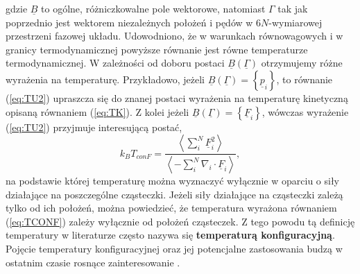 \documentclass[12pt,a4paper,openright]{report} %
\begin{document}
gdzie $\underline{B}$ to ogólne, różniczkowalne pole wektorowe, natomiast $\Gamma$ tak jak poprzednio jest wektorem niezależnych położeń i pędów w $6N$-wymiarowej przestrzeni fazowej układu. Udowodniono, że w warunkach równowagowych i w granicy termodynamicznej powyższe równanie jest równe temperaturze termodynamicznej. W zależności od doboru postaci $\underline{B}(\underline{\Gamma})$ otrzymujemy różne wyrażenia na temperaturę. Przykładowo, jeżeli $\underline{B}(\underline{\Gamma})={\left\lbrace \underline{p}_i  \right\rbrace} $, to równanie (\ref{eq:TU2}) upraszcza się do znanej postaci wyrażenia na temperaturę kinetyczną opisaną równaniem (\ref{eq:TK}). Z kolei jeżeli $\underline{B}(\underline{\Gamma})={\left\lbrace \underline{F}_i  \right\rbrace}$, wówczas wyrażenie (\ref{eq:TU2}) przyjmuje interesującą postać,
\begin{equation}
k_B T_{conF}=\frac{\left< \sum_i^N {\underline{F}_i^2} \right>}{\left<-\sum_i^N {\nabla_i \cdot \underline{F}_i} \right>},
\label{eq:TCONF}
\end{equation}  
na podstawie której temperaturę można wyznaczyć wyłącznie w oparciu o siły działające na poszczególne cząsteczki. Jeżeli siły działające na cząsteczki zależą tylko od ich położeń, można powiedzieć, że temperatura wyrażona równaniem (\ref{eq:TCONF}) zależy wyłącznie od położeń cząsteczek. Z tego powodu tą definicję temperatury w literaturze często nazywa się \textbf{temperaturą konfiguracyjną}. Pojęcie temperatury konfiguracyjnej oraz jej potencjalne zastosowania budzą w ostatnim czasie rosnące zainteresowanie \cite{TravisBraga2005,  TravisBraga2006, Hoover2009, Pieprzyk2015}.  
\end{document}
